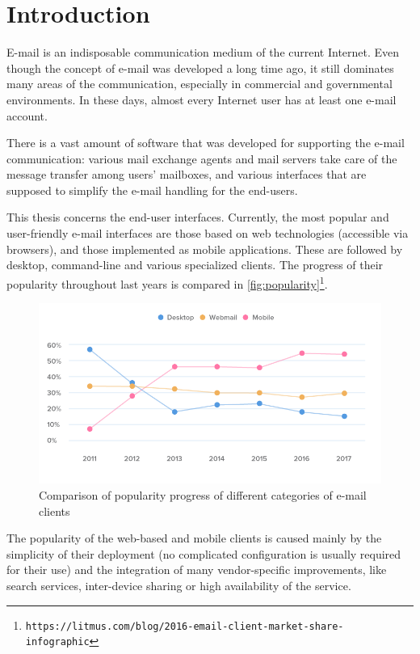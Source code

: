 \chapter*{Introduction}
E-mail is an indisposable communication medium of the current Internet. Even though the concept of e-mail was developed a long time ago, it still dominates many areas of the communication, especially in commercial and governmental environments. In these days, almost every Internet user has at least one e-mail account.

There is a vast amount of software that was developed for supporting the e-mail communication: various mail exchange agents and mail servers take care of the message transfer among users' mailboxes, and various interfaces that are supposed to simplify the e-mail handling for the end-users.

This thesis concerns the end-user interfaces.
Currently, the most popular and user-friendly e-mail interfaces are those based on web technologies (accessible via browsers), and those implemented as mobile applications. These are followed by desktop, command-line and various specialized clients. The progress of their popularity throughout last years is compared in \autoref{fig:popularity}\footnote{\texttt{https://litmus.com/blog/2016-email-client-market-share-infographic}}.
\begin{figure}
\centering
\includegraphics[width=\textwidth]{img/popularity.png}
\caption{Comparison of popularity progress of different categories of e-mail clients}
\label{fig:popularity}
\end{figure}
The popularity of the web-based and mobile clients is caused mainly by the simplicity of their deployment (no complicated configuration is usually required for their use) and the integration of many vendor-specific improvements, like search services, inter-device sharing or high availability of the service.

